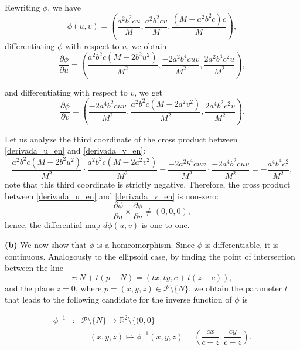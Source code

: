 \documentclass{amsart}
\theoremstyle{plain}
\numberwithin{equation}{section}
\begin{document}
\noindent Rewriting $\phi$, we have
\[
\phi(u,v) = \left( \frac{a^2b^2cu}{M}, \frac{a^2b^2cv}{M}, \frac{(M - a^2b^2c)c}{M} \right),
\]
differentiating $\phi$ with respect to $u$, we obtain
\begin{equation}\label{derivada_u_en}
	\frac{\partial \phi}{\partial u} = \left( \frac{a^2b^2c(M - 2b^2u^2)}{M^2}, \frac{-2a^2b^4cuv}{M^2}, \frac{2a^2b^4c^2u}{M^2} \right),
\end{equation}

\noindent and differentiating with respect to $v$, we get
\begin{equation}\label{derivada_v_en}
	\frac{\partial \phi}{\partial v} = \left( \frac{-2a^4b^2cuv}{M^2}, \frac{a^2b^2c(M - 2a^2v^2)}{M^2}, \frac{2a^4b^2c^2v}{M^2} \right).
\end{equation}

\noindent Let us analyze the third coordinate of the cross product between \eqref{derivada_u_en} and \eqref{derivada_v_en}:
$$
\frac{a^2b^2c(M - 2b^2u^2)}{M^2} \cdot \frac{a^2b^2c(M - 2a^2v^2)}{M^2} 
- \frac{-2a^2b^4cuv}{M^2} \cdot \frac{-2a^4b^2cuv}{M^2} 
= -\frac{a^4b^4c^2}{M^2},
$$
note that this third coordinate is strictly negative. Therefore, the cross product between \eqref{derivada_u_en} and \eqref{derivada_v_en} is non-zero:
$$
\frac{\partial \phi}{\partial u} \times \frac{\partial \phi}{\partial v} \neq (0,0,0),
$$
hence, the differential map $d\phi(u,v)$ is one-to-one.

\noindent\textbf{(b)} We now show that $\phi$ is a homeomorphism. Since $\phi$ is differentiable, it is continuous. Analogously to the ellipsoid case, by finding the point of intersection between the line  
$$
r: N + t(p - N) = (tx, ty, c + t(z - c)),
$$
and the plane $z = 0$, where $p = (x, y, z) \in \mathcal{P} \setminus \{N\}$, we obtain the parameter $t$ that leads to the following candidate for the inverse function of $\phi$ is

\begin{equation}\label{inversa_paraboloide}
	\begin{array}{rcl}
		\phi^{-1} & : & \mathcal{P} \setminus \{N \} \longrightarrow  \mathbb{R}^2 \setminus \{(0,0 \} \\
		&  & \quad (x,y,z) \longmapsto \phi^{-1}(x,y,z) = \left( \dfrac{cx}{c-z}, \dfrac{cy}{c - z} \right).
	\end{array}
\end{equation}
\end{document}
